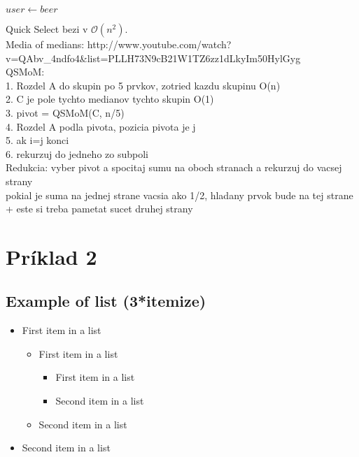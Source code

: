 \documentclass[paper=a4, fontsize=11pt]{scrartcl} %
\numberwithin{equation}{section} %
\numberwithin{figure}{section} %
\numberwithin{table}{section} %
\begin{document}
\begin{algorithmic}[5]
        \State $user \gets beer$
    \EndWhile
\end{algorithmic}

Quick Select bezi v $\mathcal{O}(n^2)$. \\
Media of medians: http://www.youtube.com/watch?v=QAbv_4ndfo4&list=PLLH73N9cB21W1TZ6zz1dLkyIm50HylGyg \\

QSMoM: \\
1. Rozdel A do skupin po 5 prvkov, zotried kazdu skupinu O(n) \\
2. C je pole tychto medianov tychto skupin O(1) \\
3. pivot = QSMoM(C, n/5) \\
4. Rozdel A podla pivota, pozicia pivota je j \\
5. ak i=j konci \\
6. rekurzuj do jedneho zo subpoli \\

Redukcia: vyber pivot a spocitaj sumu na oboch stranach a rekurzuj do vacsej strany \\
[x_1, x_2, ... ,x_j, x_{j+1}, ... x_n]
pokial je suma na jednej strane vacsia ako 1/2, hladany prvok bude na tej strane + este si treba pametat sucet druhej strany



\pagebreak

\section*{Príklad 2}

\subsection{Example of list (3*itemize)}
\begin{itemize}
	\item First item in a list 
		\begin{itemize}
		\item First item in a list 
			\begin{itemize}
			\item First item in a list 
			\item Second item in a list 
			\end{itemize}
		\item Second item in a list 
		\end{itemize}
	\item Second item in a list 
\end{itemize}
\end{document}
